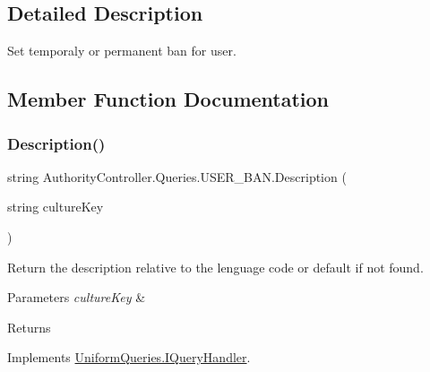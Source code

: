 \subsection{Detailed Description}
Set temporaly or permanent ban for user. 



\subsection{Member Function Documentation}
\mbox{\label{class_authority_controller_1_1_queries_1_1_u_s_e_r___b_a_n_a0635966a71b389cbb4354e61e3c52513}} 
\subsubsection{\texorpdfstring{Description()}{Description()}}
{\footnotesize\ttfamily string Authority\+Controller.\+Queries.\+U\+S\+E\+R\+\_\+\+B\+A\+N.\+Description (\begin{DoxyParamCaption}\item[{string}]{culture\+Key }\end{DoxyParamCaption})}



Return the description relative to the lenguage code or default if not found. 


\begin{DoxyParams}{Parameters}
{\em culture\+Key} & \\
\hline
\end{DoxyParams}
\begin{DoxyReturn}{Returns}

\end{DoxyReturn}


Implements \mbox{\hyperlink{interface_uniform_queries_1_1_i_query_handler_abe2d1124630ca8d74b7398d11c873526}{Uniform\+Queries.\+I\+Query\+Handler}}.

\mbox{\label{class_authority_controller_1_1_queries_1_1_u_s_e_r___b_a_n_a719795c950c9dedbc187c2c0cfca37a7}} 
